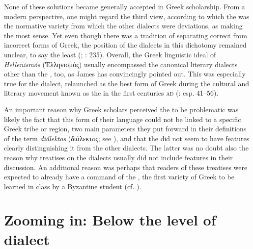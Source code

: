 None of these solutions became generally accepted in Greek scholarship. From a modern perspective, one might regard the third view, according to which the  was the normative variety from which the other dialects were deviations, as making the most sense. Yet even though there was a tradition of  separating correct from incorrect forms of Greek, the position of the dialects in this dichotomy remained unclear, to say the least (\citealt{Versteegh1986}; \citealt{Dickey2007}: 235). Overall, the Greek linguistic ideal of \textit{Hellēnismós} (Ἑλληνισμός) usually encompassed the canonical literary dialects other than the , too, as James \citet{Clackson2015} has convincingly pointed out. This was especially true for the  dialect, relaunched as the best form of Greek during the cultural and literary movement known as the  in the first centuries \textsc{ad} (\citealt{Whitmarsh2005}: esp. 41–56).

An important reason why Greek scholars perceived the  to be problematic was likely the fact that this form of their language could not be linked to a specific Greek tribe or region, two main parameters they put forward in their definitions of the term \textit{diálektos} (διάλεκτoς; see \citealt{VanRooy2016d}), and that the  did not seem to have features clearly distinguishing it from the other dialects. The latter was no doubt also the reason why treatises on the dialects usually did not include  features in their discussion. An additional reason was perhaps that readers of these treatises were expected to already have a command of the , the first variety of Greek to be learned in class by a Byzantine student (cf. \citealt{VanRooy2016b}).

\section{Zooming in: Below the level of dialect}\label{sec:2.4}


